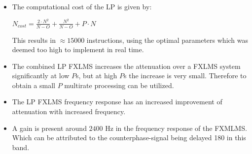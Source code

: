 \large
\begin{itemize}
\item The computational cost of the LP is given by:

\begin{center}
{\large
$N_{cost}=\frac{2 \cdot N^2}{N-O}+\frac{N^2}{N-O}+P \cdot N$
}
\end{center}


	  This results in $\approx15000$ instructions, using the optimal parameters which was deemed too high to implement in real time. \\
\item The combined LP FXLMS increases the attenuation over a FXLMS system significantly at low $P$s, but at high $P$s the increase is very small. 
	  Therefore to obtain a small $P$ multirate processing can be utilized. \\ 
\item The LP FXLMS frequency response has an increased improvement of attenuation with increased frequency. \\
\item A gain is present around $2400$ Hz in the frequency response of the FXMLMS. Which can be attributed to the counterphase-signal being delayed 180 in this band.

\end{itemize}

